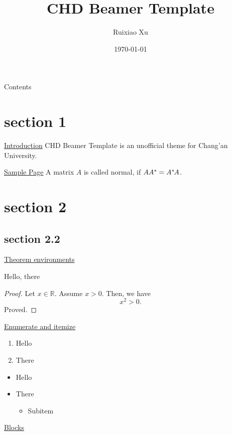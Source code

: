\documentclass{ctexbeamer}
\title{CHD Beamer Template}
\author{Ruixiao Xu}
\institute{School of Information Engineering\\Chang'an University}
\date{\today}
\begin{document}
\begin{frame}
  \maketitle
\end{frame}

\begin{frame}{Contents}
  \tableofcontents
\end{frame}

\section{section 1}
\begin{frame}{\underline{Introduction}}
  \alert{CHD Beamer Template} is an unofficial theme for Chang'an University.
\end{frame}

\begin{frame}{\underline{Sample Page}}
  A matrix $A$ is called normal, if $AA^*=A^*\mskip-2muA$.
\end{frame}

\section{section 2}
\subsection{section 2.2}
\begin{frame}{\underline{Theorem environments}}
  \begin{theorem}
    Hello, there
  \end{theorem}
  \begin{proof}
    Let $x \in \mathbb{R}$. Assume $x > 0$. Then, we have
    \begin{equation}
      x^2 > 0.
    \end{equation}
    Proved.
  \end{proof}
\end{frame}

\begin{frame}{\underline{Enumerate and itemize}}
  \begin{enumerate}
    \item Hello
    \item There
  \end{enumerate}
  \begin{itemize}
    \item Hello
    \item There
          \begin{itemize}
            \item Subitem
          \end{itemize}
  \end{itemize}
\end{frame}

\begin{frame}{\underline{Blocks}}
  \itshape\lipsum[3]
\end{frame}

\begin{frame}
  \begin{center}
    \Huge{}
  \end{center}
\end{frame}
\end{document}

